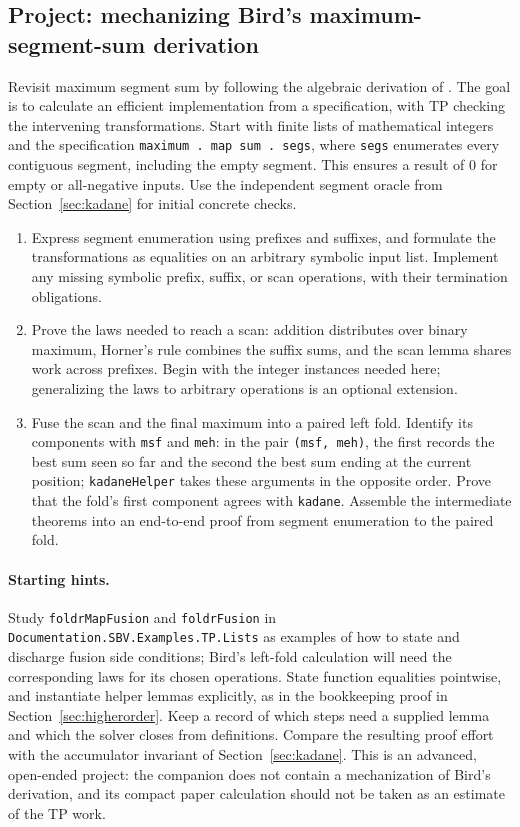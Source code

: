 \documentclass[review]{jfp-epi}
\newcommand{\code}[1]{\texttt{#1}}
\begin{document}
\subsection{Project: mechanizing Bird's maximum-segment-sum derivation}
\label{sec:bird-project}

Revisit maximum segment sum by following the algebraic derivation of
\citet{birdCalculation}. The goal is to calculate an efficient implementation
from a specification, with TP checking the intervening transformations.
Start with finite lists of mathematical integers and the specification
\code{maximum . map sum . segs}, where \code{segs} enumerates every contiguous
segment, including the empty segment. This ensures a result of 0 for empty or
all-negative inputs. Use the independent segment oracle from
Section~\ref{sec:kadane} for initial concrete checks.

\begin{enumerate}
\item Express segment enumeration using prefixes and suffixes, and formulate
  the transformations as equalities on an arbitrary symbolic input list.
  Implement any missing symbolic prefix, suffix, or scan operations, with
  their termination obligations.
\item Prove the laws needed to reach a scan: addition distributes over binary
  maximum, Horner's rule combines the suffix sums, and the scan lemma shares
  work across prefixes. Begin with the integer instances needed here;
  generalizing the laws to arbitrary operations is an optional extension.
\item Fuse the scan and the final maximum into a paired left fold. Identify
  its components with \code{msf} and \code{meh}: in the pair \code{(msf, meh)},
  the first records the best sum seen so far and the second the best sum ending
  at the current position; \code{kadaneHelper} takes these arguments in the
  opposite order. Prove that the fold's first component agrees with \code{kadane}.
  Assemble the intermediate theorems into an
  end-to-end proof from segment enumeration to the paired fold.
\end{enumerate}

\paragraph{Starting hints.}
Study \code{foldrMapFusion} and \code{foldrFusion} in
\code{Documentation.\allowbreak SBV.\allowbreak Examples.\allowbreak TP.\allowbreak Lists}
as examples of how to state and discharge fusion side conditions; Bird's
left-fold calculation will need the corresponding laws for its chosen
operations. State function equalities pointwise, and instantiate helper lemmas
explicitly, as in the bookkeeping proof in Section~\ref{sec:higherorder}.
Keep a record of which steps need a supplied lemma and which the solver closes
from definitions. Compare the resulting proof effort with the accumulator
invariant of Section~\ref{sec:kadane}. This is an advanced, open-ended project:
the companion does not contain a mechanization of Bird's derivation, and its
compact paper calculation should not be taken as an estimate of the TP work.
\end{document}
